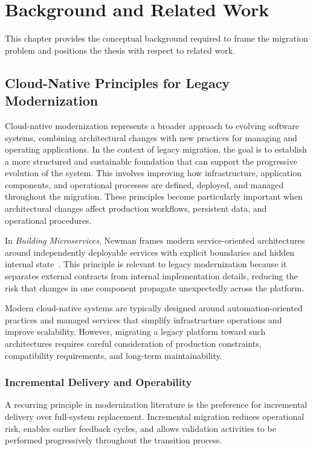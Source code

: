 \chapter{Background and Related Work}
\label{chap:background}

This chapter provides the conceptual background required to frame the migration problem and positions the thesis with respect to related work.

\section{Cloud-Native Principles for Legacy Modernization}
Cloud-native modernization represents a broader approach to evolving software systems, combining architectural changes with new practices for managing and operating applications. In the context of legacy migration, the goal is to establish a more structured and sustainable foundation that can support the progressive evolution of the system. This involves improving how infrastructure, application components, and operational processes are defined, deployed, and managed throughout the migration. These principles become particularly important when architectural changes affect production workflows, persistent data, and operational procedures.

In \emph{Building Microservices}, Newman frames modern service-oriented architectures around independently deployable services with explicit boundaries and hidden internal state~\cite{newman2021building}. This principle is relevant to legacy modernization because it separates external contracts from internal implementation details, reducing the risk that changes in one component propagate unexpectedly across the platform.

Modern cloud-native systems are typically designed around automation-oriented practices and managed services that simplify infrastructure operations and improve scalability. However, migrating a legacy platform toward such architectures requires careful consideration of production constraints, compatibility requirements, and long-term maintainability.

\subsection{Incremental Delivery and Operability}
A recurring principle in modernization literature is the preference for incremental delivery over full-system replacement. Incremental migration reduces operational risk, enables earlier feedback cycles, and allows validation activities to be performed progressively throughout the transition process.

